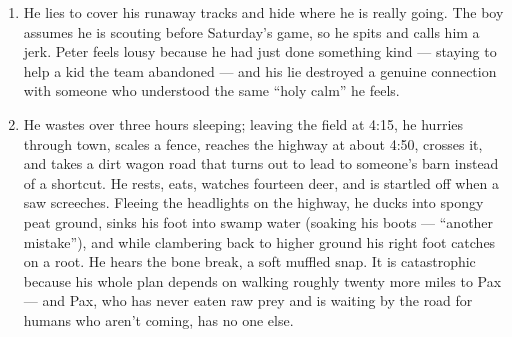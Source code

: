 \documentclass[11pt]{article}
\begin{document}
\begin{enumerate}
  \item He lies to cover his runaway tracks and hide where he is really going. The boy assumes he is scouting before Saturday's game, so he spits and calls him a jerk. Peter feels lousy because he had just done something kind --- staying to help a kid the team abandoned --- and his lie destroyed a genuine connection with someone who understood the same ``holy calm'' he feels.
  \item He wastes over three hours sleeping; leaving the field at 4:15, he hurries through town, scales a fence, reaches the highway at about 4:50, crosses it, and takes a dirt wagon road that turns out to lead to someone's barn instead of a shortcut. He rests, eats, watches fourteen deer, and is startled off when a saw screeches. Fleeing the headlights on the highway, he ducks into spongy peat ground, sinks his foot into swamp water (soaking his boots --- ``another mistake''), and while clambering back to higher ground his right foot catches on a root. He hears the bone break, a soft muffled snap. It is catastrophic because his whole plan depends on walking roughly twenty more miles to Pax --- and Pax, who has never eaten raw prey and is waiting by the road for humans who aren't coming, has no one else.
\end{enumerate}
\end{document}
